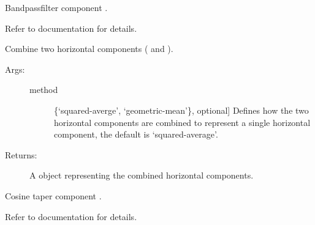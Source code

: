 \documentclass[letterpaper,10pt,english,openany,oneside]{sphinxmanual}
\begin{document}
\begin{fulllineitems}
\begin{fulllineitems}
\label{\detokenize{index:hvsrpy.Sensor3c.bandpassfilter}}
Bandpassfilter component .

Refer to  documentation for details.

\end{fulllineitems}


\begin{fulllineitems}
\label{\detokenize{index:hvsrpy.Sensor3c.combine_horizontals}}
Combine two horizontal components ( and ).
\begin{description}
\item[{Args:}] \leavevmode\begin{description}
\item[{method}] \leavevmode{[}\{‘squared-averge’, ‘geometric-mean’\}, optional{]}
Defines how the two horizontal components are combined 
to represent a single horizontal component, the default
is ‘squared-average’.

\end{description}

\item[{Returns:}] \leavevmode
A  object representing the combined
horizontal components.

\end{description}

\end{fulllineitems}


\begin{fulllineitems}
\label{\detokenize{index:hvsrpy.Sensor3c.cosine_taper}}
Cosine taper component .

Refer to  documentation for details.

\end{fulllineitems}


\end{fulllineitems}
\end{document}

